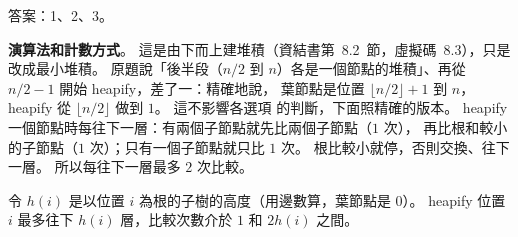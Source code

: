 \begin{pastsoln}
答案：1、2、3。

\textbf{演算法和計數方式}。 這是由下而上建堆積（資結書第~8.2~節，虛擬碼~8.3），只是改成最小堆積。
原題說「後半段（$n/2$ 到 $n$）各是一個節點的堆積」、再從 $n/2 - 1$ 開始 heapify，差了一：精確地說，
葉節點是位置 $\lfloor n/2 \rfloor + 1$ 到 $n$，heapify 從 $\lfloor n/2 \rfloor$ 做到 $1$。 這不影響各選項
的判斷，下面照精確的版本。 heapify 一個節點時每往下一層：有兩個子節點就先比兩個子節點（$1$ 次），
再比根和較小的子節點（$1$ 次）；只有一個子節點就只比 $1$ 次。 根比較小就停，否則交換、往下一層。
所以每往下一層最多 $2$ 次比較。

令 $h(i)$ 是以位置 $i$ 為根的子樹的高度（用邊數算，葉節點是 $0$）。 heapify 位置 $i$ 最多往下
$h(i)$ 層，比較次數介於 $1$ 和 $2h(i)$ 之間。


\end{pastsoln}
